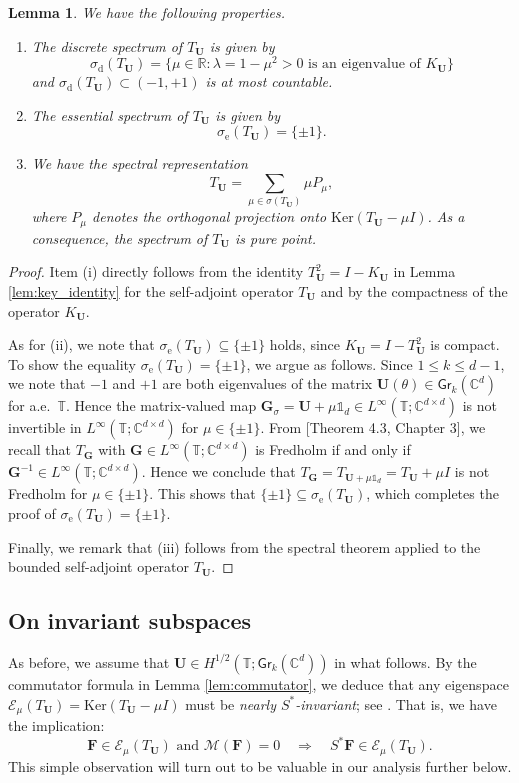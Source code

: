 \documentclass[10pt,reqno,a4paper]{amsart}
\newtheorem{lem}{Lemma}[section]
\theoremstyle{definition}
\theoremstyle{remark}
\theoremstyle{remark}
\numberwithin{equation}{section}
\newcommand{\C}{\mathbb{C}}
\newcommand{\R}{\mathbb{R}}
\newcommand{\T}{\mathbb{T}}
\newcommand{\Mean}{\mathscr{M}}
\renewcommand{\ker}{\mathrm{Ker}}
\newcommand{\Ub}{\mathbf{U}}
\newcommand{\Fb}{\mathbf{F}}
\newcommand{\Gb}{\mathbf{G}}
\newcommand{\id}{I}
\newcommand{\Gr}{\mathsf{Gr}}
\newcommand{\sd}{\sigma_{\mathrm{d}}}
\newcommand{\se}{\sigma_{\mathrm{e}}}
\newcommand{\Es}{\mathscr{E}}
\begin{document}
\begin{lem} \label{lem:Toeplitz_spectrum}
We have the following properties.
\begin{enumerate}
\item[(i)] The discrete spectrum of $T_\Ub$ is given by 
$$
\sd(T_{\Ub}) = \{ \mu \in \R : \mbox{$\lambda = 1-\mu^2 > 0$ is an eigenvalue of $K_\Ub$} \} 
$$ 
and $\sd(T_\Ub) \subset (-1,+1)$ is at most countable.

\item[(ii)] The essential spectrum of $T_\Ub$ is given by
$$
\se(T_\Ub) = \{ \pm 1 \}.
$$

\item[(iii)] We have the spectral representation
$$
T_{\Ub} = \sum_{\mu \in \sigma(T_\Ub)} \mu P_\mu,
$$
where $P_\mu$ denotes the orthogonal projection onto $\ker (T_\Ub - \mu \id)$. As a consequence, the spectrum of $T_{\Ub}$ is pure point.
\end{enumerate}
\end{lem}


\begin{proof}
Item (i) directly follows from the identity $T_\Ub^2 = \id - K_\Ub$ in Lemma \ref{lem:key_identity} for the self-adjoint operator $T_\Ub$ and by the compactness of the operator $K_\Ub$.

As for (ii), we note that $\se(T_\Ub) \subseteq \{ \pm 1 \}$ holds, since $K_\Ub= \id - T_\Ub^2$ is compact. To show the equality $\se(T_\Ub) = \{ \pm 1 \}$, we argue as follows. Since $1 \leq k \leq d-1$, we note that $-1$ and $+1$ are both eigenvalues of the matrix $\Ub(\theta) \in \Gr_k(\C^d)$ for a.e.~$\T$. Hence the matrix-valued map $\Gb_\sigma = \Ub + \mu \mathds{1}_d \in L^\infty(\T; \C^{d \times d})$ is not invertible in $L^\infty(\T; \C^{d \times d})$ for $\mu \in \{ \pm 1 \}$. From \cite{Pe-03}[Theorem 4.3, Chapter 3], we recall that $T_\Gb$ with $\Gb \in L^\infty(\T; \C^{d \times d})$ is Fredholm if and only if $\Gb^{-1} \in L^\infty(\T; \C^{d \times d})$. Hence we conclude that $T_{\Gb} = T_{\Ub + \mu \mathds{1}_d} = T_\Ub + \mu  \id$ is not Fredholm for $\mu \in \{ \pm 1 \}$. This shows that $\{ \pm 1 \} \subseteq \se(T_\Ub)$, which completes the proof of $\se(T_\Ub) = \{ \pm 1 \}$.

Finally, we remark that (iii) follows from the spectral theorem applied to the bounded self-adjoint operator $T_\Ub$.
\end{proof}



\subsection{On invariant subspaces}
As before, we assume that $\Ub \in H^{1/2}(\T; \Gr_k(\C^d))$ in what follows. By the commutator formula in Lemma \ref{lem:commutator}, we deduce that any eigenspace $\Es_\mu(T_\Ub)=\ker (T_\Ub - \mu \id)$ must be {\em nearly $S^*$-invariant}; see \cite{Sa-88}. That is, we have the implication:
$$
\mbox{$\Fb \in \Es_\mu(T_\Ub)$ and $\Mean(\Fb) = 0$} \quad \Rightarrow \quad S^* \Fb \in \Es_\mu(T_\Ub).
$$
This simple observation will turn out to be valuable in our analysis further below. 
\end{document}
